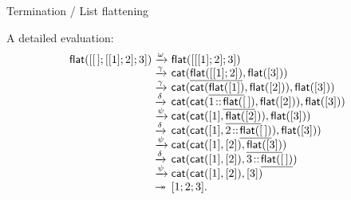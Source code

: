 \documentclass[compress,dvipdfmx]{beamer}
\newcommand\fun[1]{\textsf{#1}}
\newcommand\el{[\,]}
\newcommand\cons[2]{{#1}\!::\!{#2}}
\begin{document}
%
\begin{frame}{Termination / List flattening}

  A detailed evaluation:
    \begin{equation*}
      \begin{array}{r@{\;}l@{\;}l}
        \fun{flat}([\el;[[1];2];3])
        & \xrightarrow{\omega}
        & \fun{flat}([[[1];2];3])\\
        & \xrightarrow{\smash{\gamma}}
        & \fun{cat}(\underline{\fun{flat}([[1];2])},\fun{flat}([3]))\\
        & \xrightarrow{\smash{\gamma}}
        & \fun{cat}(\fun{cat}(\underline{\fun{flat}([1])},\fun{flat}([2])),
        \fun{flat}([3]))\\
        & \xrightarrow{\smash{\delta}}
        & \fun{cat}(\fun{cat}(\cons{1}{\underline{\fun{flat}(\el)}},
        \fun{flat}([2])), \fun{flat}([3]))\\
        & \xrightarrow{\smash{\psi}}
        & \fun{cat}(\fun{cat}([1],\underline{\fun{flat}([2])}),
        \fun{flat}([3]))\\
        & \xrightarrow{\smash{\delta}}
        & \fun{cat}(\fun{cat}([1],\cons{2}{\underline{\fun{flat}(\el)}}),
        \fun{flat}([3]))\\
        & \xrightarrow{\smash{\psi}}
        & \fun{cat}(\fun{cat}([1],[2]),\underline{\fun{flat}([3])})\\
        & \xrightarrow{\smash{\delta}}
        & \fun{cat}(\fun{cat}([1],[2]),\cons{3}{\underline{\fun{flat}(\el)}})\\
        & \xrightarrow{\smash{\psi}}
        & \fun{cat}(\fun{cat}([1],[2]),[3])\\
        & \twoheadrightarrow & [1;2;3].
      \end{array}
    \end{equation*}

\end{frame}
\end{document}
